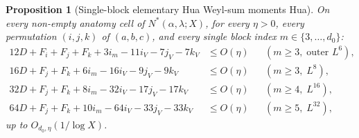 \documentclass[11pt,a4paper]{amsart}
\theoremstyle{plain}
\newtheorem{proposition}[theorem]{Proposition}
\theoremstyle{definition}
\theoremstyle{remark}
\begin{document}
\begin{proposition}[Single-block elementary Hua Weyl-sum moments \textsf{Hua}]\label{prop:hua}
On every non-empty anatomy cell of $N^*(\alpha,\lambda;X)$, for every $\eta > 0$, every permutation $(i,j,k)$ of $(a,b,c)$, and every \emph{single} block index $m \in \{3,\dots,d_0\}$:
\begin{align}
  12 D + F_i + F_j + F_k + 3 i_m - 11 i_V - 7 j_V - 7 k_V &\le O(\eta) && (m \ge 3,\; \text{outer } L^6), \label{eq:hua6} \\
  16 D + F_j + F_k + 6 i_m - 16 i_V - 9 j_V - 9 k_V &\le O(\eta) && (m \ge 3,\; L^8), \label{eq:hua8} \\
  32 D + F_j + F_k + 8 i_m - 32 i_V - 17 j_V - 17 k_V &\le O(\eta) && (m \ge 4,\; L^{16}), \label{eq:hua16} \\
  64 D + F_j + F_k + 10 i_m - 64 i_V - 33 j_V - 33 k_V &\le O(\eta) && (m \ge 5,\; L^{32}), \label{eq:hua32}
\end{align}
up to $O_{d_0,\eta}(1/\log X)$.
\end{proposition}
\end{document}
